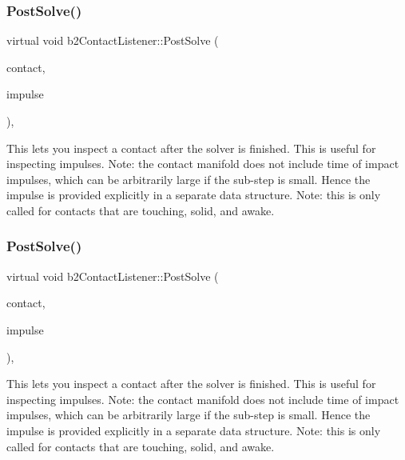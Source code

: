 \subsubsection{\texorpdfstring{Post\+Solve()}{PostSolve()}\hspace{0.1cm}{\footnotesize\ttfamily [1/2]}}
{\footnotesize\ttfamily virtual void b2\+Contact\+Listener\+::\+Post\+Solve (\begin{DoxyParamCaption}\item[{\hyperlink{classb2Contact}{b2\+Contact} $\ast$}]{contact,  }\item[{const \hyperlink{structb2ContactImpulse}{b2\+Contact\+Impulse} $\ast$}]{impulse }\end{DoxyParamCaption})\hspace{0.3cm}{\ttfamily [inline]}, {\ttfamily [virtual]}}

This lets you inspect a contact after the solver is finished. This is useful for inspecting impulses. Note\+: the contact manifold does not include time of impact impulses, which can be arbitrarily large if the sub-\/step is small. Hence the impulse is provided explicitly in a separate data structure. Note\+: this is only called for contacts that are touching, solid, and awake. \mbox{\label{classb2ContactListener_acd58ec96f7569b95eec65b8ca3f8013d}} 
\subsubsection{\texorpdfstring{Post\+Solve()}{PostSolve()}\hspace{0.1cm}{\footnotesize\ttfamily [2/2]}}
{\footnotesize\ttfamily virtual void b2\+Contact\+Listener\+::\+Post\+Solve (\begin{DoxyParamCaption}\item[{\hyperlink{classb2Contact}{b2\+Contact} $\ast$}]{contact,  }\item[{const \hyperlink{structb2ContactImpulse}{b2\+Contact\+Impulse} $\ast$}]{impulse }\end{DoxyParamCaption})\hspace{0.3cm}{\ttfamily [inline]}, {\ttfamily [virtual]}}

This lets you inspect a contact after the solver is finished. This is useful for inspecting impulses. Note\+: the contact manifold does not include time of impact impulses, which can be arbitrarily large if the sub-\/step is small. Hence the impulse is provided explicitly in a separate data structure. Note\+: this is only called for contacts that are touching, solid, and awake. \mbox{\label{classb2ContactListener_a416f85eb45a1099053402b15a19a7de0}} 
